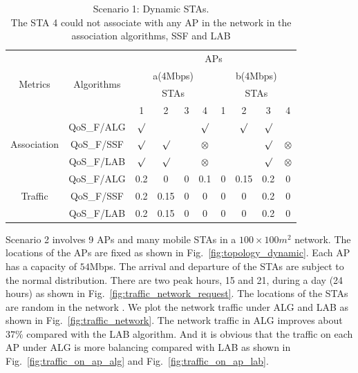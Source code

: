 \documentclass[conference]{IEEEtran}
\begin{document}
  \begin{table}[htbp]
  \centering
  \footnotesize
  \caption{Scenario 1: Dynamic STAs.\protect\\ The STA 4 could not associate with any AP in the network in the association algorithms, SSF and LAB }\label{tb:scenario_1}
    \begin{tabular}{|c|c|c|c|c|c|c|c|c|c|}
      \hline
      \multirow{4}{*}{Metrics}&\multirow{4}{*}{Algorithms}&\multicolumn{8}{|c|}{APs}\\
      \cline{3-10}
      &&\multicolumn{4}{|c|}{a(4Mbps)}&\multicolumn{4}{|c|}{b(4Mbps)}\\
      \cline{3-10}
      &&\multicolumn{4}{|c|}{STAs}&\multicolumn{4}{|c|}{STAs}\\
      \cline{3-10}
      &&1&2&3&4&1&2&3&4\\
      \hline
      \multirow{3}{*}{Association}
      &QoS\_F/ALG&$\surd$ &&&$\surd$&&$\surd$&$\surd$&\\
      \cline{2-10}
      &QoS\_F/SSF&$\surd$ &$\surd$&&$\otimes$&&&$\surd$&$\otimes$\\
      \cline{2-10}
      &QoS\_F/LAB&$\surd$ &$\surd$&&$\otimes$&&&$\surd$&$\otimes$\\

      \hline
      \multirow{3}{*}{Traffic}
      &QoS\_F/ALG&0.2&0&0&0.1&0&0.15&0.2&0\\
      \cline{2-10}
      &QoS\_F/SSF&0.2&0.15&0&0&0&0&0.2&0\\
      \cline{2-10}
      ($\times 10^3$ Mb)&QoS\_F/LAB&0.2&0.15&0&0&0&0&0.2&0\\

      \hline
    \end{tabular}

  \end{table}


  Scenario 2 involves 9 APs and many mobile STAs in a $100\times100m^2$ network.  The locations of the APs are fixed as shown in Fig.~\ref{fig:topology_dynamic}. Each AP has a capacity of $54$Mbps.  The arrival and departure of the STAs are subject to the normal distribution. There are two peak hours, 15 and 21, during a day (24 hours) as shown in Fig.~\ref{fig:traffic_network_request}.  The locations of the STAs are random in the network .  We plot the network traffic under ALG and LAB as shown in Fig.~\ref{fig:traffic_network}.  The network traffic in ALG improves about $37\%$ compared with the LAB algorithm.  And it is obvious that the traffic on each AP under ALG is more balancing compared with LAB as shown in Fig.~\ref{fig:traffic_on_ap_alg} and Fig.~\ref{fig:traffic_on_ap_lab}.
\end{document}

